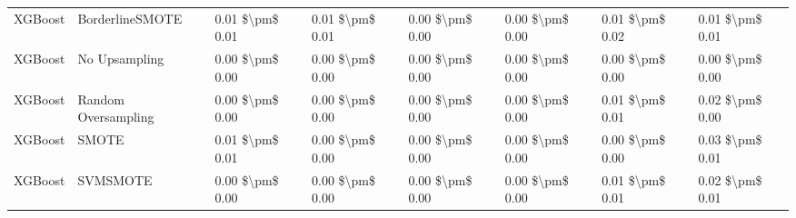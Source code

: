 \begin{tabular}{llllllll}
                        XGBoost &               BorderlineSMOTE & 0.01 \$\textbackslash pm\$ 0.01 &           0.01 \$\textbackslash pm\$ 0.01 &       0.00 \$\textbackslash pm\$ 0.00 &        0.00 \$\textbackslash pm\$ 0.00 &                         0.01 \$\textbackslash pm\$ 0.02 &     0.01 \$\textbackslash pm\$ 0.01 \\
                        XGBoost &                 No Upsampling & 0.00 \$\textbackslash pm\$ 0.00 &           0.00 \$\textbackslash pm\$ 0.00 &       0.00 \$\textbackslash pm\$ 0.00 &        0.00 \$\textbackslash pm\$ 0.00 &                         0.00 \$\textbackslash pm\$ 0.00 &     0.00 \$\textbackslash pm\$ 0.00 \\
                        XGBoost &           Random Oversampling & 0.00 \$\textbackslash pm\$ 0.00 &           0.00 \$\textbackslash pm\$ 0.00 &       0.00 \$\textbackslash pm\$ 0.00 &        0.00 \$\textbackslash pm\$ 0.00 &                         0.01 \$\textbackslash pm\$ 0.01 &     0.02 \$\textbackslash pm\$ 0.00 \\
                        XGBoost &                         SMOTE & 0.01 \$\textbackslash pm\$ 0.01 &           0.00 \$\textbackslash pm\$ 0.00 &       0.00 \$\textbackslash pm\$ 0.00 &        0.00 \$\textbackslash pm\$ 0.00 &                         0.00 \$\textbackslash pm\$ 0.00 &     0.03 \$\textbackslash pm\$ 0.01 \\
                        XGBoost &                      SVMSMOTE & 0.00 \$\textbackslash pm\$ 0.00 &           0.00 \$\textbackslash pm\$ 0.00 &       0.00 \$\textbackslash pm\$ 0.00 &        0.00 \$\textbackslash pm\$ 0.00 &                         0.01 \$\textbackslash pm\$ 0.01 &     0.02 \$\textbackslash pm\$ 0.01 \\
\bottomrule
\end{tabular}
